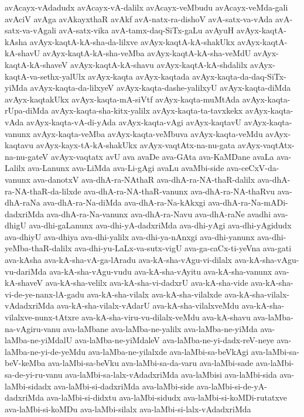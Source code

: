 {avAcayx-vAdadudx
avAcayx-vA-dalilx
avAcayx-veMbudu
avAcayx-veMda-gali
avAciV
avAga
avAkayxthaR
avAkf
avA-natx-ra-dishoV
avA-satx-va-vAda
avA-satx-va-vAgali
avA-satx-vika
avA-tamx-daq-SiTx-gaLu
avAyuH
avAyx-kaqtA-kAsha
avAyx-kaqtA-kA-sha-da-lilxve
avAyx-kaqtA-kA-shakUkx
avAyx-kaqtA-kA-shavU
avAyx-kaqtA-kA-sha-veMba
avAyx-kaqtA-kA-sha-veMdU
avAyx-kaqtA-kA-shaveV
avAyx-kaqtA-kA-shavu
avAyx-kaqtA-kA-shdalilx
avAyx-kaqtA-va-sethx-yalUlx
avAyx-kaqta
avAyx-kaqtada
avAyx-kaqta-da-daq-SiTx-yiMda
avAyx-kaqta-da-lilxyeV
avAyx-kaqta-dashe-yalilxyU
avAyx-kaqta-diMda
avAyx-kaqtakUkx
avAyx-kaqta-mA-siVtf
avAyx-kaqta-muMtAda
avAyx-kaqta-rUpa-diMda
avAyx-kaqta-sha-kitx-yalilx
avAyx-kaqta-ta-tavxkekx
avAyx-kaqta-vAda
avAyx-kaqta-vA-di-yAda
avAyx-kaqta-vAgi
avAyx-kaqtavU
avAyx-kaqta-vanunx
avAyx-kaqta-veMba
avAyx-kaqta-veMbuva
avAyx-kaqta-veMdu
avAyx-kaqtavu
avAyx-kayx-tA-kA-shakUkx
avAyx-vaqtAtx-na-nu-gata
avAyx-vaqtAtx-na-nu-gateV
avAyx-vaqtatx
avU
ava
avaDe
ava-GAta
ava-KaMDane
avaLa
ava-Lalilx
ava-Lanunx
ava-LiMda
ava-Li-gAgi
avaLu
avaMbi-side
ava-ceCxV-da-vanunx
ava-danotxV
ava-dhA-ra-NAthaR
ava-dhA-ra-NA-thaR-dalilx
ava-dhA-ra-NA-thaR-da-lilxde
ava-dhA-ra-NA-thaR-vanunx
ava-dhA-ra-NA-thaRvu
ava-dhA-raNa
ava-dhA-ra-Na-diMda
ava-dhA-ra-Na-kAkxgi
ava-dhA-ra-Na-mADi-dadxriMda
ava-dhA-ra-Na-vanunx
ava-dhA-ra-Navu
ava-dhA-raNe
avadhi
ava-dhigU
ava-dhi-gaLanunx
ava-dhi-yA-dadxriMda
ava-dhi-yAgi
ava-dhi-yAgidudx
ava-dhiyU
ava-dhiya
ava-dhi-yalilx
ava-dhi-ya-nAnxgi
ava-dhi-yanunx
ava-dhi-yeMba-thaR-dalilx
ava-dhi-yu-LaLx-va-sutx-vigU
ava-ga-caCx-ti-yeVna
ava-gati
ava-kAsha
ava-kA-sha-vA-ga-lAradu
ava-kA-sha-vAgu-vi-dilalx
ava-kA-sha-vAgu-vu-dariMda
ava-kA-sha-vAgu-vudu
ava-kA-sha-vAyitu
ava-kA-sha-vanunx
ava-kA-shaveV
ava-kA-sha-velilx
ava-kA-sha-vi-dadxrU
ava-kA-sha-vide
ava-kA-sha-vi-de-ye-nanx-lA-gadu
ava-kA-sha-vilalx
ava-kA-sha-vilalxde
ava-kA-sha-vilalx-vAdadxriMda
ava-kA-sha-vilalx-vAdarU
ava-kA-sha-vilalxveMdu
ava-kA-sha-vilalxve-nunx-tAtxre
ava-kA-sha-viru-vu-dilalx-veMdu
ava-kA-shavu
ava-laMba-na-vAgiru-vanu
ava-laMbane
ava-laMba-ne-yalilx
ava-laMba-ne-yiMda
ava-laMba-ne-yiMdalU
ava-laMba-ne-yiMdaleV
ava-laMba-ne-yi-dadx-reV-neye
ava-laMba-ne-yi-de-yeMdu
ava-laMba-ne-yilalxde
ava-laMbi-sa-beVkAgi
ava-laMbi-sa-beV-keMba
ava-laMbi-sa-beVku
ava-laMbi-sa-da-varu
ava-laMbi-sade
ava-laMbi-sa-de-yi-ru-vanu
ava-laMbi-sa-lalx-vAdadxriMda
ava-laMbisi
ava-laMbi-sida
ava-laMbi-sidadx
ava-laMbi-si-dadxriMda
ava-laMbi-side
ava-laMbi-si-de-yA-dadxriMda
ava-laMbi-si-didxtu
ava-laMbi-sidudx
ava-laMbi-si-koMDi-rutatxve
ava-laMbi-si-koMDu
ava-laMbi-silalx
ava-laMbi-si-lalx-vAdadxriMda
}
